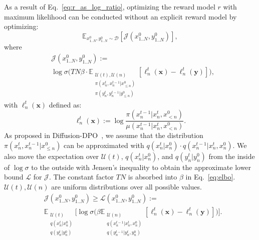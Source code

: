 \documentclass{article}
\begin{document}
As a result of Eq.~\eqref{eq:r_as_log_ratio}, optimizing the reward model $r$ with maximum likelihood can be conducted without an explicit reward model by optimizing:
\begin{equation}
\mathbb{E}_{x_{1..N}^0, y_{1..N}^0 \sim \mathcal{D}} \left[ \mathcal{J}(x_{1..N}^0, y_{1..N}^0) \right],
\end{equation}
where
\begin{equation}
\begin{aligned}
&\mathcal{J}(x_{1..N}^0, y_{1..N}^0) := \\
&\log \sigma \Big( 
T N \beta \cdot \mathbb{E}_{\substack{\mathcal{U}(t), \mathcal{U}(n) \\ \pi(x_n^t, x_n^{t-1} | x_{\leq n}^0) \\ \pi(y_n^t, y_n^{t-1} | y_{\leq n}^0)}} \left[
\ell_{n}^t (\mathbf{x}) - \ell_{n}^t (\mathbf{y})
\right]
\Big),
\end{aligned}
\end{equation}
with $\ell_n^t (\mathbf{x})$ defined as:
\begin{equation}
\ell_n^t (\mathbf{x}) := \log \frac{\pi(x_{n}^{t - 1} | x_n^t, x_{<n}^0)}{\mu(x_n^{t - 1} | x_n^t, x_{<n}^0)}.
\end{equation}
As proposed in Diffusion-DPO~\cite{DiffusionDPO}, we assume that the distribution $\pi(x_n^t, x_n^{t - 1} | x_{\leq n}^0)$ can be approximated with $q(x_n^t | x_n^0) \cdot q(x_{n}^{t-1} | x_n^t, x_n^0)$. We also move the expectation over $\mathcal{U}(t)$, $q(x_n^t | x_n^0)$, and $q(y_n^t | y_n^0)$ from the inside of $\log \sigma$ to the outside with Jensen's inequality to obtain the approximate lower bound $\mathcal{L}$ for $\mathcal{J}$. The constant factor $T N$ is absorbed into $\beta$ in Eq.~\eqref{eq:elbo}. $\mathcal U(t), \mathcal U(n)$ are uniform distributions over all possible values.
\begin{equation}
\label{eq:elbo}
\begin{aligned}
&\mathcal{J}(x_{1..N}^0, y_{1..N}^0) \geq \mathcal{L}(x_{1..N}^0, y_{1..N}^0) := \\
& \mathbb{E}_{\substack{\mathcal{U}(t) \\ q(x_n^t | x_n^0) \\ q(y_n^t | y_n^0)}} \Big[
\log \sigma \Big( 
\beta \mathbb{E}_{\substack{\mathcal{U}(n) \\ q(x_{n}^{t-1} | x_n^t, x_{n}^0) \\ q(y_{n}^{t-1} | y_n^t, y_{n}^0)}} \left[
\ell_{n}^t (\mathbf{x}) - \ell_{n}^t (\mathbf{y})
\right]
\Big)
\Big].
\end{aligned}
\end{equation}
\end{document}
